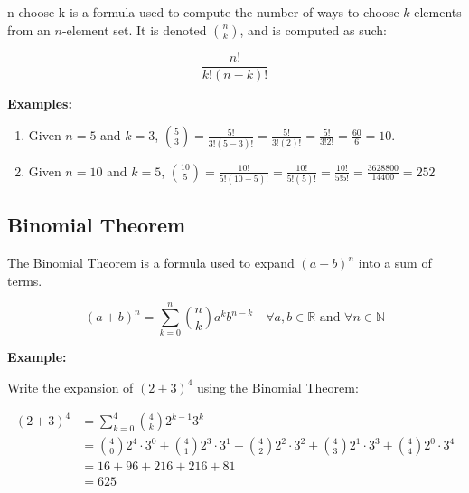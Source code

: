 \documentclass{article}
\begin{document}
n-choose-k is a formula used to compute the number of ways to choose $k$ elements from an $n$-element set. It is denoted $\binom{n}{k}$, and is computed as such: 

$$
\frac{n!}{k!(n-k)!}
$$

\textbf{Examples:}
\begin{enumerate}
    \item Given $n = 5$ and $k = 3$, $\binom{5}{3} = \frac{5!}{3!(5-3)!} = \frac{5!}{3!(2)!} = \frac{5!}{3!2!} = \frac{60}{6} = 10$.
    \item Given $n = 10$ and $k = 5$, $\binom{10}{5} = \frac{10!}{5!(10-5)!} = \frac{10!}{5!(5)!} = \frac{10!}{5!5!} = \frac{3628800}{14400} = 252$
\end{enumerate}

\subsection{Binomial Theorem}

The Binomial Theorem is a formula used to expand $(a + b)^n$ into a sum of terms.

$$
(a+b)^n = \sum_{k=0}^n \binom{n}{k} a^k b^{n-k} \quad \forall a,b \in \mathbb{R} \text{ and } \forall n \in \mathbb{N}
$$

\textbf{Example:}

Write the expansion of $(2+3)^4$ using the Binomial Theorem:

\begin{align*}
    (2+3)^4 &= \sum_{k=0}^4 \binom{4}{k} 2^{k-1} 3^k \\
    &= \binom{4}{0} 2^4 \cdot 3^0 + \binom{4}{1} 2^3 \cdot 3^1 + \binom{4}{2} 2^2 \cdot 3^2 + \binom{4}{3} 2^1 \cdot 3^3 + \binom{4}{4} 2^0 \cdot 3^4 \\
    &= 16 + 96 + 216 + 216 + 81 \\
    &= 625
\end{align*}
\end{document}
